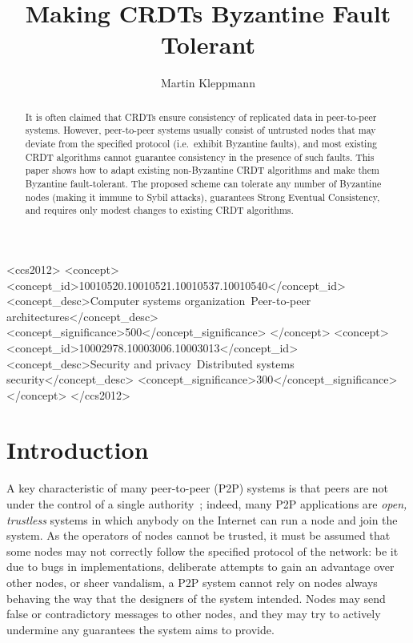 \documentclass[sigplan,review]{acmart}
\begin{document}
\title{Making CRDTs Byzantine Fault Tolerant}
\author{Martin Kleppmann}

\begin{abstract}
It is often claimed that CRDTs ensure consistency of replicated data in peer-to-peer systems.
However, peer-to-peer systems usually consist of untrusted nodes that may deviate from the specified protocol (i.e.\ exhibit Byzantine faults), and most existing CRDT algorithms cannot guarantee consistency in the presence of such faults.
This paper shows how to adapt existing non-Byzantine CRDT algorithms and make them Byzantine fault-tolerant.
The proposed scheme can tolerate any number of Byzantine nodes (making it immune to Sybil attacks), guarantees Strong Eventual Consistency, and requires only modest changes to existing CRDT algorithms.
\end{abstract}

\begin{CCSXML}
<ccs2012>
    <concept>
        <concept_id>10010520.10010521.10010537.10010540</concept_id>
        <concept_desc>Computer systems organization~Peer-to-peer architectures</concept_desc>
        <concept_significance>500</concept_significance>
    </concept>
    <concept>
        <concept_id>10002978.10003006.10003013</concept_id>
        <concept_desc>Security and privacy~Distributed systems security</concept_desc>
        <concept_significance>300</concept_significance>
    </concept>
</ccs2012>
\end{CCSXML}


\maketitle

\section{Introduction}\label{sec:introduction}

A key characteristic of many peer-to-peer (P2P) systems is that peers are not under the control of a single authority~\cite{Buford:2010}; indeed, many P2P applications are \emph{open, trustless} systems in which anybody on the Internet can run a node and join the system.
As the operators of nodes cannot be trusted, it must be assumed that some nodes may not correctly follow the specified protocol of the network: be it due to bugs in implementations, deliberate attempts to gain an advantage over other nodes, or sheer vandalism, a P2P system cannot rely on nodes always behaving the way that the designers of the system intended.
Nodes may send false or contradictory messages to other nodes, and they may try to actively undermine any guarantees the system aims to provide.
\end{document}
